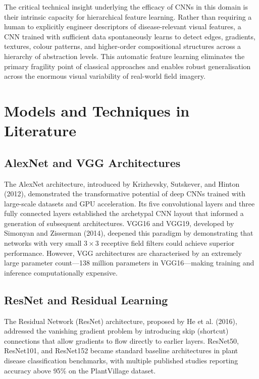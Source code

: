 \documentclass[12pt,a4paper]{report}
\begin{document}
The critical technical insight underlying the efficacy of CNNs in this domain is their intrinsic capacity for hierarchical feature learning. Rather than requiring a human to explicitly engineer descriptors of disease-relevant visual features, a CNN trained with sufficient data spontaneously learns to detect edges, gradients, textures, colour patterns, and higher-order compositional structures across a hierarchy of abstraction levels. This automatic feature learning eliminates the primary fragility point of classical approaches and enables robust generalisation across the enormous visual variability of real-world field imagery.

\section{Models and Techniques in Literature}

\subsection{AlexNet and VGG Architectures}

The AlexNet architecture, introduced by Krizhevsky, Sutskever, and Hinton (2012), demonstrated the transformative potential of deep CNNs trained with large-scale datasets and GPU acceleration. Its five convolutional layers and three fully connected layers established the archetypal CNN layout that informed a generation of subsequent architectures. VGG16 and VGG19, developed by Simonyan and Zisserman (2014), deepened this paradigm by demonstrating that networks with very small $3 \times 3$ receptive field filters could achieve superior performance. However, VGG architectures are characterised by an extremely large parameter count---138 million parameters in VGG16---making training and inference computationally expensive.

\subsection{ResNet and Residual Learning}

The Residual Network (ResNet) architecture, proposed by He et al. (2016), addressed the vanishing gradient problem by introducing skip (shortcut) connections that allow gradients to flow directly to earlier layers. ResNet50, ResNet101, and ResNet152 became standard baseline architectures in plant disease classification benchmarks, with multiple published studies reporting accuracy above 95\% on the PlantVillage dataset.
\end{document}
